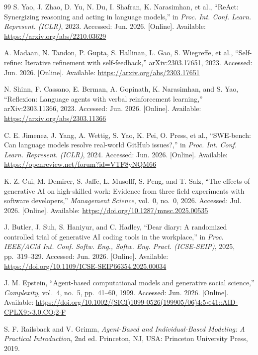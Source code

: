 \begin{thebibliography}{99}
S. Yao, J. Zhao, D. Yu, N. Du, I. Shafran, K. Narasimhan, et al.,
``ReAct: Synergizing reasoning and acting in language models,'' in
\emph{Proc. Int. Conf. Learn. Represent. (ICLR)}, 2023. Accessed:
Jun. 2026. [Online]. Available: \url{https://arxiv.org/abs/2210.03629}

A. Madaan, N. Tandon, P. Gupta, S. Hallinan, L. Gao, S. Wiegreffe, et al.,
``Self-refine: Iterative refinement with self-feedback,''
arXiv:2303.17651, 2023. Accessed: Jun. 2026. [Online]. Available:
\url{https://arxiv.org/abs/2303.17651}

N. Shinn, F. Cassano, E. Berman, A. Gopinath, K. Narasimhan, and S. Yao,
``Reflexion: Language agents with verbal reinforcement learning,''
arXiv:2303.11366, 2023. Accessed: Jun. 2026. [Online]. Available:
\url{https://arxiv.org/abs/2303.11366}

C. E. Jimenez, J. Yang, A. Wettig, S. Yao, K. Pei, O. Press, et al.,
``SWE-bench: Can language models resolve real-world GitHub issues?,'' in
\emph{Proc. Int. Conf. Learn. Represent. (ICLR)}, 2024. Accessed:
Jun. 2026. [Online]. Available:
\url{https://openreview.net/forum?id=VTF8yNQM66}

K. Z. Cui, M. Demirer, S. Jaffe, L. Musolff, S. Peng, and T. Salz, ``The
effects of generative AI on high-skilled work: Evidence from three field
experiments with software developers,'' \emph{Management Science}, vol.~0,
no.~0, 2026. Accessed: Jul. 2026. [Online]. Available:
\url{https://doi.org/10.1287/mnsc.2025.00535}

J. Butler, J. Suh, S. Haniyur, and C. Hadley, ``Dear diary: A randomized
controlled trial of generative AI coding tools in the workplace,'' in
\emph{Proc. IEEE/ACM Int. Conf. Softw. Eng., Softw. Eng. Pract.
(ICSE-SEIP)}, 2025, pp.~319--329. Accessed: Jun. 2026. [Online]. Available:
\url{https://doi.org/10.1109/ICSE-SEIP66354.2025.00034}

J. M. Epstein, ``Agent-based computational models and generative social
science,'' \emph{Complexity}, vol.~4, no.~5, pp.~41--60, 1999. Accessed:
Jun. 2026. [Online]. Available:
\url{https://doi.org/10.1002/(SICI)1099-0526(199905/06)4:5<41::AID-CPLX9>3.0.CO;2-F}

S. F. Railsback and V. Grimm, \emph{Agent-Based and Individual-Based
Modeling: A Practical Introduction}, 2nd ed. Princeton, NJ, USA:
Princeton University Press, 2019.


\end{thebibliography}
